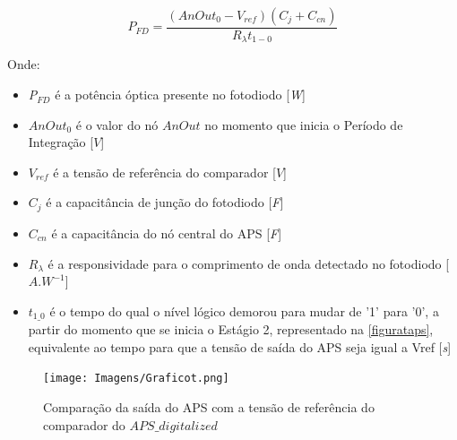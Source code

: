\begin{equation}
    \label{eq_apsd}
    P_{FD} = \frac{(AnOut_0-V_{ref})(C_{j}+C_{cn})}{R_{\lambda}t_{1-0}}
\end{equation}

Onde:

\begin{itemize}

    \item \textit{P$_{FD}$} \'e a pot\^encia \'optica presente no fotodiodo [\textit{W}]
    \item $AnOut_0$ \'e o valor do nó $AnOut$ no momento que inicia o Período de Integração [$V$]
    \item \textit{$V_{ref}$} \'e a tensão de refer\^encia do comparador [$V$]
    \item \textit{$C_j$} \'e a capacit\^ancia de junção do fotodiodo [\textit{F}]
    \item \textit{$C_{cn}$} \'e a capacit\^ancia do n\'o central do APS [\textit{F}]
    \item $R_{\lambda}$ \'e a responsividade para o comprimento de onda detectado no fotodiodo [$A.W^{-1}$]
    \item $t_{1\_0}$ \'e o tempo do qual o n\'ivel l\'ogico demorou para mudar de '1' para '0', a partir do momento que se inicia o Estágio 2, representado na \autoref{figurataps}, equivalente ao tempo para que a tensão de saída do APS seja igual a Vref [\textit{s}]
    
\end{itemize}

\begin{figure}[!h]
 \centering
    \centering
    \caption{\label{figurataps}Comparação da saída do APS com a tensão de referência do comparador do $APS\_digitalized$ \NomeBloco} 
    \texttt{[image: Imagens/Graficot.png]}
    \label{\NomePFig}
\end{figure}
